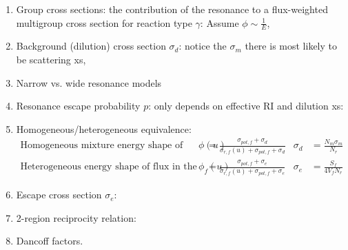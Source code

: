 \documentclass{school-22.211-notes}
\begin{document}
\begin{enumerate}
\begin{enumerate}
\end{enumerate}
\item Group cross sections: the contribution of the resonance to a flux-weighted multigroup cross section for reaction type $\gamma$:
  Assume $\phi \sim \frac{1}{E}$,
\item Background (dilution) cross section $\sigma_d$: notice the $\sigma_m$ there is most likely to be scattering xs,
\item Narrow vs. wide resonance models
\item Resonance escape probability $p$: only depends on effective RI and dilution xs: 
\item Homogeneous/heterogeneous equivalence: 
  \begin{align*}
    \mbox{Homogeneous mixture energy shape of flux } \phi(u) &= \frac{\sigma_{pot, f} + \sigma_d}{\sigma_{r,f} (u) + \sigma_{pot, f} + \sigma_d}   & \sigma_d &= \frac{N_m \sigma_m}{N_r}  \\
    \mbox{Heterogeneous energy shape of flux in the fuel } \phi_f(u) &= \frac{\sigma_{pot, f} + \sigma_e}{\sigma_{r,f} (u) + \sigma_{pot, f} + \sigma_e}   & \sigma_e &= \frac{S_f}{4 V_f N_r} 
  \end{align*}
\item Escape cross section $\sigma_e$: 
\item 2-region reciprocity relation:
\item Dancoff factors.
\end{enumerate}
\end{document}
